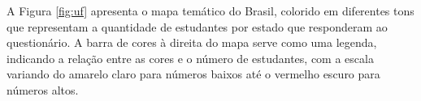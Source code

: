     

    
    
    
    




A Figura \ref{fig:uf} apresenta o mapa temático do Brasil, colorido em diferentes tons que representam a quantidade de estudantes por estado que responderam ao questionário. A barra de cores à direita do mapa serve como uma legenda, indicando a relação entre as cores e o número de estudantes, com a escala variando do amarelo claro para números baixos até o vermelho escuro para números altos.

